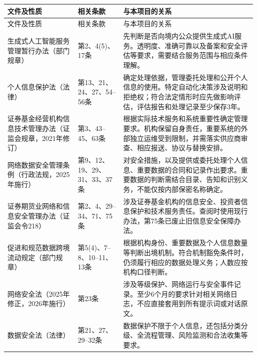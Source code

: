{\fontsize{9.5}{12}\selectfont
\begin{longtable}{@{}P{43mm}P{32mm}P{77mm}@{}}
\toprule 文件及性质 & 相关条款 & 与本项目的关系\\\midrule\endfirsthead
\toprule 文件及性质 & 相关条款 & 与本项目的关系\\\midrule\endhead
\bottomrule\endlastfoot
生成式人工智能服务管理暂行办法\newline（部门规章） & 第2、4(5)、17条 & 先判断是否向境内公众提供生成式AI服务。透明度、准确可靠以及备案和安全评估等要求，需要结合服务范围与相应条件理解。\\
个人信息保护法\newline（法律） & 第13、21、24、27、54--56条 & 确定处理依据，管理委托处理和公开个人信息的使用。特定自动化决策涉及说明和拒绝权；符合法定情形时应先做影响评估，评估报告和处理记录至少保存3年。\\
证券基金经营机构信息技术管理办法\newline（证监会规章，2021年修订） & 第3、43--45、63条 & 根据实际技术服务和系统重要性确定管理要求。机构保留自身责任，重要系统的外部独立运维受到限制，并需落实供应商审查、相应报送、协议与替换安排。\\
网络数据安全管理条例\newline（行政法规，2025年施行） & 第9、12、19、29、31、33、37条 & 对安全措施，以及提供或委托处理个人信息、重要数据的合同和记录作出要求。重要数据的判断需结合目录、告知和识别义务，不能仅按内部保密名称确定。\\
证券期货业网络和信息安全管理办法\newline（证监会令218） & 第2、4、29--34、71、75条 & 涉及证券基金机构的信息安全、投资者信息保护和技术服务责任。查阅时使用现行办法，第75条已废止旧信息安全保障办法。\\
促进和规范数据跨境流动规定\newline（部门规章） & 第5(4)、7--8、10--11、13条 & 根据机构身份、重要数据及个人信息数量等判断出境机制。符合机制豁免条件时，仍须履行相应的数据处理义务；人数应按机构口径判断。\\
网络安全法\newline（2025年修正，2026年施行） & 第23条 & 涉及等级保护、网络运行与安全事件记录。至少6个月的要求针对相关网络日志，不应直接套用到所有提示词或对话原文。\\
数据安全法\newline（法律） & 第21、27、29--32条 & 数据保护不限于个人信息，还包括分类分级、全流程管理、风险监测和合法收集等要求。\\

\end{longtable}}
